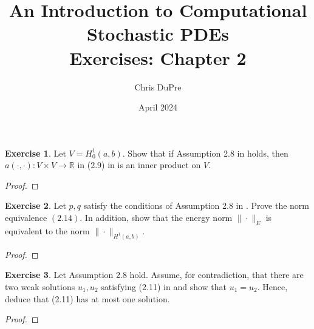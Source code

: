 \documentclass{amsart}
\title{An Introduction to Computational Stochastic PDEs\\ Exercises: Chapter 2}
\author{Chris DuPre }
\date{April 2024}
\theoremstyle{plain}
\theoremstyle{definition}
\newtheorem{exer}{Exercise}[section]
\newcommand{\R}{\mathbb{R}}
\begin{document}
\maketitle
\setcounter{section}{2}
\begin{exer}
    Let $V = H_0^1(a,b).$ Show that if Assumption 2.8 in \cite{lord2014introduction} holds, then $a(\cdot,\cdot): V\times V\to \R$ in (2.9) in \cite{lord2014introduction} is an inner product on $V.$
\end{exer}
\begin{proof}
    
\end{proof}

\begin{exer}
    Let $p,q$ satisfy the conditions of Assumption 2.8 in \cite{lord2014introduction}. Prove the norm equivalence $(2.14).$ In addition, show that the energy norm $\|\cdot \|_{E}$ is equivalent to the norm $\|\cdot \|_{H^1(a,b)}.$
\end{exer}
\begin{proof}
    
\end{proof}

\begin{exer}
    Let Assumption 2.8 hold. Assume, for contradiction, that there are two weak solutions $u_1,u_2$ satisfying (2.11) in \cite{lord2014introduction} and show that $u_1 = u_2$. Hence, deduce that (2.11) has at most one solution.
\end{exer}
\begin{proof}
    
\end{proof}
\end{document}
